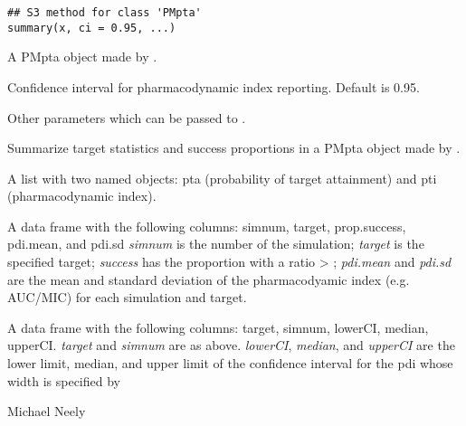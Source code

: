 \documentclass[a4paper]{book}
\begin{document}
%
\begin{Usage}
\begin{verbatim}
## S3 method for class 'PMpta'
summary(x, ci = 0.95, ...)
\end{verbatim}
\end{Usage}
%
\begin{Arguments}
\begin{ldescription}
\item[\code{x}] A PMpta object made by .

\item[\code{ci}] Confidence interval for pharmacodynamic index reporting.  Default is 0.95.

\item[\code{...}] Other parameters which can be passed to .
\end{ldescription}
\end{Arguments}
%
\begin{Details}\relax
Summarize target statistics and success proportions in a PMpta object made by .
\end{Details}
%
\begin{Value}
A list with two named objects: pta (probability of target attainment)
and pti (pharmacodynamic index).
\begin{ldescription}
\item[\code{pta }] A data frame with the following columns: simnum, target, prop.success, pdi.mean, and pdi.sd  
\emph{simnum} is the number of the simulation; \emph{target} is the specified target; 
\emph{success}  has the proportion with a ratio > ; \emph{pdi.mean} and \emph{pdi.sd} 
are the mean and standard deviation of the pharmacodyamic index (e.g. AUC/MIC) for each simulation and target.
\item[\code{pdi }] A data frame with the following columns: target, simnum, lowerCI, median, upperCI.
\emph{target} and \emph{simnum} are as above. \emph{lowerCI}, \emph{median}, 
and \emph{upperCI} are the lower limit, median, and upper limit of the confidence
interval for the pdi whose width is specified by 
\end{ldescription}
\end{Value}
%
\begin{Author}\relax
Michael Neely
\end{Author}
%
\begin{SeeAlso}\relax
{}
\end{SeeAlso}
\end{document}
